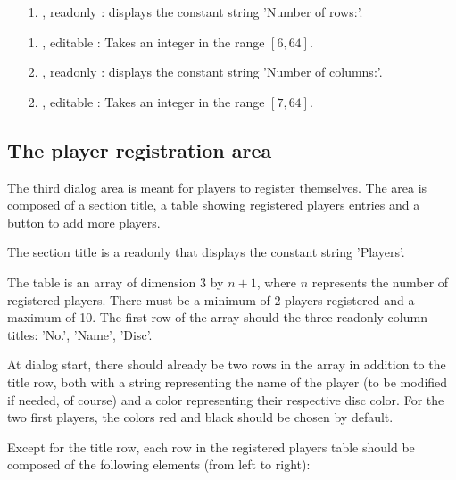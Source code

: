   \begin{enumerate}
    \item[1.]    , readonly : displays the constant string 'Number of
                                         rows:'.
    \item[1.] , editable : Takes an integer in the range $[6, 64]$.
    \item[2.]    , readonly : displays the constant string 'Number of
                                         columns:'.
    \item[2.] , editable : Takes an integer in the range $[7, 64]$.
  \end{enumerate}


  \subsection{The player registration area} \label{dlg:PlayerReg}
  The third dialog area is meant for players to register themselves. The area is
  composed of a section title, a table showing registered players entries and a
  button to add more players.

  The section title is a readonly  that displays the constant string
  'Players'.

  The table is an array of dimension 3 by $n + 1$, where $n$ represents
  the number of registered players. There must be a minimum of 2 players
  registered and a maximum of 10. The first row of the array should the
  three readonly column titles: 'No.', 'Name', 'Disc'.

  At dialog start, there should already be two rows in the array in addition to
  the title row, both with a string representing the name of the player
  (to be modified if needed, of course) and a color representing their
  respective disc color. For the two first players, the colors red and black
  should be chosen by default.

  Except for the title row, each row in the registered players table should
  be composed of the following elements (from left to right):


